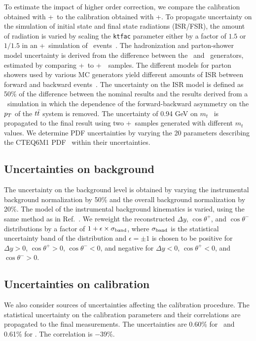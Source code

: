 \documentclass[aps,prd,twocolumn,showpacs,superscriptaddress,groupedaddress,floatfix]{revtex4}
\begin{document}
To estimate the impact of higher order correction,
we compare  the calibration obtained with  \mcatnlo+\herwig\ to the calibration obtained with \alpgen+\herwig.
To propagate uncertainty on the simulation of initial state and final state radiations (ISR/FSR), the 
amount of radiation is varied  by  scaling the \texttt{ktfac} parameter either by a factor of $1.5$ or  $1/1.5$ in an \alpgen+\pythia\ simulation of \ttbar\ events~\cite{Abazov:2015spa}.
The hadronization and parton-shower model uncertainty
is derived from the difference between the \pythia\ and \herwig\ generators,
estimated by comparing \alpgen+\herwig\ to \alpgen+\pythia\ \ttbar\ samples.
The different models for parton showers used by various  MC generators yield
different amounts of ISR between forward and backward events~\cite{Skands:2012mm,Winter:2013xka}.
The uncertainty on the ISR model is defined
as  50\% of the difference between the nominal results and 
the results derived from a \mcatnlo\ simulation
in which the dependence of the forward-backward asymmetry on the $\mbox{$p_T$}$ of the $t\bar{t}$ system is removed.
The uncertainty of 0.94 GeV on $m_t$~\cite{Aaltonen:2012ra}  is propagated to the final result using two \alpgen+\pythia\  samples generated with different $m_t$ values.
We determine PDF uncertainties by varying the 20 parameters describing the \textsc{CTEQ6M1} PDF~\cite{Nadolsky:2008zw} within their uncertainties.



\subsection{Uncertainties on  background}

The uncertainty on the background level is  obtained by varying  the instrumental background normalization by 50\%
and
the overall background normalization by 20\%.
The model of the instrumental background kinematics  is varied, using the same method as in Ref.~\cite{Abazov:2013wxa}.
We  reweight  the reconstructed $\Delta y$, $\cos\theta^+$, and $\cos\theta^-$ distributions by  a factor of $1+\epsilon\times \sigma_{\rm band}$,
where $ \sigma_{\rm band}$ is the statistical uncertainty band of the distribution and $\epsilon=\pm 1$ is chosen to be
positive  for $\Delta y>0$, $\cos\theta^+>0$, $\cos\theta^-<0$, and negative for $\Delta y<0$, $\cos\theta^+<0$, and $\cos\theta^->0$.





\subsection{Uncertainties on calibration}
\label{sec:syst_functionnal_form}
We also consider sources of uncertainties affecting the calibration procedure.
The statistical uncertainty on the calibration parameters and their correlations  are propagated to the final measurements. The uncertainties are 0.60\% 
for \Att\ and 0.61\% for \Ptt. The correlation is $-39\%$.
\end{document}
